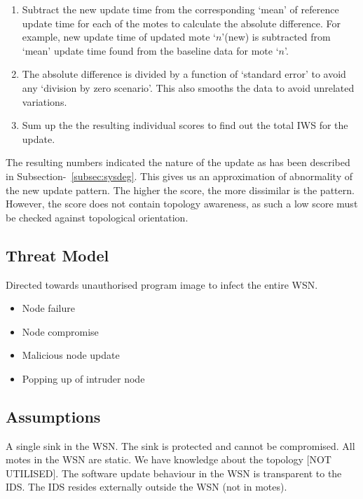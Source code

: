 \documentclass[conference,final]{IEEEtran}
\begin{document}
\begin{enumerate}
\item Subtract the new update time from the corresponding `mean' of reference update time for each of the motes to calculate the absolute difference. For example, new update time of updated mote `$n$'(new) is subtracted from `mean' update time found from the baseline data for mote `$n$'.
\item The absolute difference is divided by a function of `standard error' to avoid any `division by zero scenario'. This also smooths the data to avoid unrelated variations.
\item Sum up the the resulting individual scores to find out the total IWS for the update.
\end{enumerate}
The resulting numbers indicated the nature of the update as has been described in Subsection-~\ref{subsec:sysdeg}.
This gives us an approximation of abnormality of the new update pattern. The higher the score, the more dissimilar is the pattern. 
However, the score does not contain topology awareness, as such a low score must be checked against topological orientation.



\subsection{Threat Model}


Directed towards unauthorised program image to infect the entire WSN.
\begin{itemize}
\item Node failure
\item Node compromise
\item Malicious node update
\item Popping up of intruder node
\end{itemize}

\subsection{Assumptions}
\label{sc:assump}
A single sink in the WSN.
The sink is protected and cannot be compromised.
All motes in the WSN are static.
We have knowledge about the topology [NOT UTILISED].
The software update behaviour in the WSN is transparent to the IDS.
The IDS resides externally outside the WSN (not in motes).
\end{document}

